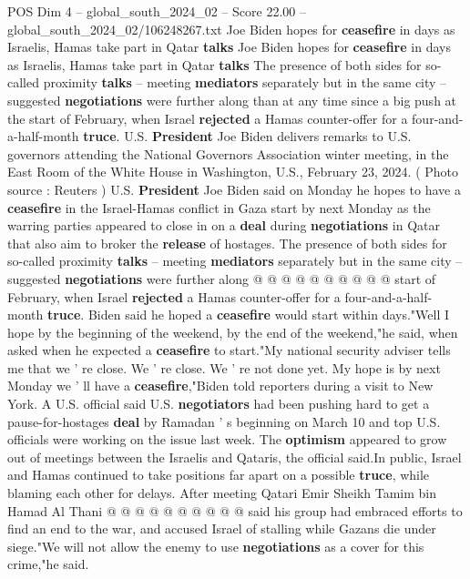 \begin{textsample}{POS Dim 4 – global\_south\_2024\_02 – Score 22.00 – global\_south\_2024\_02/106248267.txt}  \label{ex:f4_pos_075}
Joe Biden hopes for \textbf{ceasefire} in days as Israelis, Hamas take part in Qatar \textbf{talks} Joe Biden hopes for \textbf{ceasefire} in days as Israelis, Hamas take part in Qatar \textbf{talks} The presence of both sides for so-called proximity \textbf{talks} -- meeting \textbf{mediators} separately but in the same city -- suggested \textbf{negotiations} were further along than at any time since a big push at the start of February, when Israel \textbf{rejected} a Hamas counter-offer for a four-and-a-half-month \textbf{truce}.
U.S. \textbf{President} Joe Biden delivers remarks to U.S. governors attending the National Governors Association winter meeting, in the East Room of the White House in Washington, U.S., February 23, 2024. ( Photo source : Reuters ) U.S. \textbf{President} Joe Biden said on Monday he hopes to have a \textbf{ceasefire} in the Israel-Hamas conflict in Gaza start by next Monday as the warring parties appeared to close in on a \textbf{deal} during \textbf{negotiations} in Qatar that also aim to broker the \textbf{release} of hostages.
The presence of both sides for so-called proximity \textbf{talks} -- meeting \textbf{mediators} separately but in the same city -- suggested \textbf{negotiations} were further along @ @ @ @ @ @ @ @ @ @ start of February, when Israel \textbf{rejected} a Hamas counter-offer for a four-and-a-half-month \textbf{truce}.
Biden said he hoped a \textbf{ceasefire} would start within days."Well I hope by the beginning of the weekend, by the end of the weekend,"he said, when asked when he expected a \textbf{ceasefire} to start."My national security adviser tells me that we ' re close.
We ' re close.
We ' re not done yet.
My hope is by next Monday we ' ll have a \textbf{ceasefire},"Biden told reporters during a visit to New York.
A U.S. official said U.S. \textbf{negotiators} had been pushing hard to get a pause-for-hostages \textbf{deal} by Ramadan ' s beginning on March 10 and top U.S. officials were working on the issue last week.
The \textbf{optimism} appeared to grow out of meetings between the Israelis and Qataris, the official said.In public, Israel and Hamas continued to take positions far apart on a possible \textbf{truce}, while blaming each other for delays.
After meeting Qatari Emir Sheikh Tamim bin Hamad Al Thani @ @ @ @ @ @ @ @ @ @ said his group had embraced efforts to find an end to the war, and accused Israel of stalling while Gazans die under siege."We will not allow the enemy to use \textbf{negotiations} as a cover for this crime,"he said.

\end{textsample}
